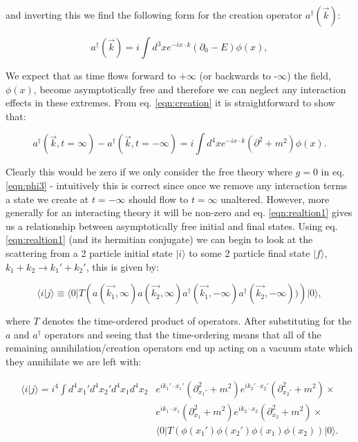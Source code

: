 	and inverting this we find the following form for the creation operator $a^\dagger(\vec{k})$:

	\begin{equation}
		a^\dagger(\vec{k}) = i\int d^3xe^{-ix\cdot k}(\partial_0 - E)\phi(x),
		\label{eqn:creation}
	\end{equation}

	We expect that as time flows forward to $+\infty$ (or backwards to -$\infty$) the field, $\phi(x)$, become asymptotically
	free and therefore we can neglect any interaction effects in these extremes.  From eq. \eqref{eqn:creation} it is
	straightforward to show that:

	\begin{equation}
		a^\dagger(\vec{k}, t=\infty) - a^\dagger(\vec{k}, t=-\infty) = i\int d^4x e^{-ix\cdot k}(\partial^2 + m^2)\phi(x).
		\label{eqn:realtion1}
	\end{equation}

	Clearly this would be zero if we only consider the free theory where $g=0$ in eq. \eqref{eqn:phi3} - intuitively this
	is correct since once we remove any interaction terms a state we create at $t=-\infty$ should flow to $t=\infty$ unaltered.
	However, more generally for an interacting theory it will be non-zero and eq. \eqref{eqn:realtion1} gives us a relationship
	between asymptotically free initial and final states.  Using eq. \eqref{eqn:realtion1} (and its hermitian conjugate) we can
	begin to look at the scattering from a 2 particle initial state $|i\rangle$ to some 2 particle final state $|f\rangle$,
	$k_1+k_2\rightarrow k_1'+k_2'$, this is given by:

	\begin{equation}
		\langle i|j\rangle\equiv\langle0|T\left(a(\vec{k_1}, \infty)a(\vec{k_2}, \infty)a^\dagger(\vec{k_1}, -\infty)a^\dagger(\vec{k_2}, -\infty))\right)|0\rangle,
	\end{equation}

	where $T$ denotes the time-ordered product of operators.  After substituting
	for the $a$ and $a^\dagger$ operators and seeing that the time-ordering means that all of the remaining annihilation/creation
	operators end up acting on a vacuum state which they annihilate we are left with:

	\begin{align*}
		\langle i|j\rangle = i^4\int d^4x_1'd^4x_2'd^4x_1d^4x_2&e^{ik_1'\cdot x_1'}(\partial^2_{x_1'} + m^2)
		e^{ik_2'\cdot x_2'}(\partial^2_{x_2'} + m^2)\times\\
		&e^{ik_1 \cdot x_1 }(\partial^2_{x_1 } + m^2)e^{ik_2 \cdot x_2 }(\partial^2_{x_2 } + m^2)\times\\
		&\langle0|T\left(\phi(x_1')\phi(x_2')\phi(x_1)\phi(x_2)\right)|0\rangle.
	\end{align*}

